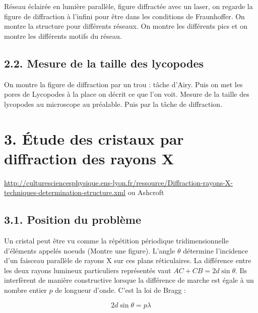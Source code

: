 \documentclass[french, a4paper, 10pt, twocolumn, landscape]{article}
\begin{document}
Réseau éclairée en lumière parallèle, figure diffractée avec un laser, on regarde la figure de diffraction à l'infini pour être dans les conditions de Fraunhoffer.
On montre la structure pour différents réseaux. On montre les différents pics et on montre les différents motifs du réseau.

\subsection*{2.2. Mesure de la taille des lycopodes}

On montre la figure de diffraction par un trou : tâche d'Airy. Puis on met les pores de Lycopodes à la place on décrit ce que l'on voit. Mesure de la taille des lycopodes au microscope au préalable. Puis par la tâche de diffraction.



\section*{3. Étude des cristaux par diffraction des rayons X}

\url{http://culturesciencesphysique.ens-lyon.fr/ressource/Diffraction-rayons-X-techniques-determination-structure.xml} ou Ashcroft

\subsection*{3.1. Position du problème}

Un cristal peut être vu comme la répétition périodique tridimensionnelle d'éléments appelés noeuds (Montre une figure). L'angle $\theta$ détermine l'incidence d'un faisceau parallèle de rayons X sur ces plans réticulaires. La différence entre les deux rayons lumineux particuliers représentés vaut $AC+CB = 2d\sin\theta$. Ils interfèrent de manière constructive lorsque la différence de marche est égale à un nombre entier $p$ de longueur d'onde. C'est la loi de Bragg : 

\begin{equation}
    2d\sin\theta = p\lambda
\end{equation}
\end{document}

